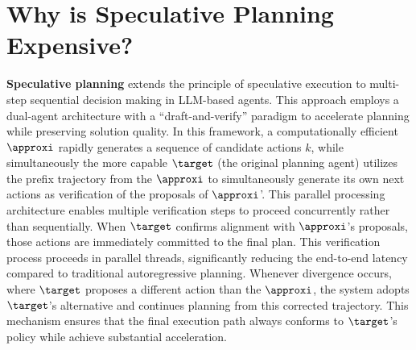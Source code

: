 \section{Why is Speculative Planning Expensive?}

\textbf{Speculative planning} extends the principle of speculative execution to multi-step sequential decision making in LLM-based agents. This approach employs a dual-agent architecture with a ``draft-and-verify'' paradigm to accelerate planning while preserving solution quality. In this framework, a computationally efficient $\approxi$ rapidly generates a sequence of candidate actions $k$, while simultaneously the more capable $\target$ (the original planning agent) utilizes the prefix trajectory from the $\approxi$ to simultaneously generate its own next actions as verification of the proposals of $\approxi$'. 
This parallel processing architecture enables multiple verification steps to proceed concurrently rather than sequentially. 
When $\target$ confirms alignment with $\approxi$'s proposals, those actions are immediately committed to the final plan. This verification process proceeds in parallel threads, significantly reducing the end-to-end latency compared to traditional autoregressive planning. Whenever divergence occurs, where $\target$ proposes a different action than the $\approxi$, the system adopts $\target$'s alternative and continues planning from this corrected trajectory. This mechanism ensures that the final execution path always conforms to $\target$'s policy 
while achieve substantial acceleration. 


